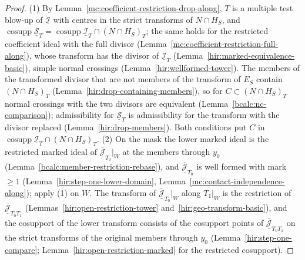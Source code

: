 \begin{proof}
\upstreamleanok
(1) By Lemma~\ref{mc:coefficient-restriction-drop-along}, \(T\) is a multiple test blow-up of \(\underline{\mathcal I}\) with centres in the strict transforms of \(N\cap H_S\), and
\(\operatorname{cosupp}\underline{\mathcal S}_T=\operatorname{cosupp}\underline{\mathcal I}_T\cap(N\cap H_S)_T\); the same holds for the restricted coefficient ideal with the full divisor
(Lemma~\ref{mc:coefficient-restriction-full-along}), whose transform has the divisor of \(\underline{\mathcal I}_T\) (Lemma~\ref{hir:marked-equivalence-basic}), simple normal crossings
(Lemma~\ref{hir:wellformed-tower}). The members of the transformed divisor that are not members of the transform of \(E_S\) contain \((N\cap H_S)_T\)
(Lemma~\ref{hir:drop-containing-members}), so for \(C\subset(N\cap H_S)_T\) normal crossings with the two divisors are equivalent (Lemma~\ref{bcalc:nc-comparison}); admissibility
for \(\underline{\mathcal S}_T\) is admissibility for the transform with the divisor replaced (Lemma~\ref{hir:drop-members}). Both conditions put \(C\) in
\(\operatorname{cosupp}\underline{\mathcal I}_T\cap(N\cap H_S)_T\).
(2) On the mask the lower marked ideal is the restricted marked ideal of \(\overline{\underline{\mathcal J}}_{T_0}|_W\) at the members through \(y_0\)
(Lemma~\ref{bcalc:member-restriction-rebase}), and \(\overline{\underline{\mathcal J}}_{T_0}\) is well formed with mark \(\ge1\) (Lemma~\ref{hir:step-one-lower-domain},
Lemma~\ref{mc:contact-independence-along}); apply (1) on \(W\). The transform of \(\overline{\underline{\mathcal J}}_{T_0}|_W\) along \(T_1|_W\) is the restriction of
\(\overline{\underline{\mathcal J}}_{T_0T_1}\) (Lemmas~\ref{hir:open-restriction-tower} and~\ref{hir:geo-transform-basic}), and the cosupport of the lower transform consists of the
cosupport points of \(\overline{\underline{\mathcal J}}_{T_0T_1}\) on the strict transforms of the original members through \(y_0\) (Lemma~\ref{hir:step-one-compare};
Lemma~\ref{hir:open-restriction-marked} for the restricted cosupport).
\end{proof}


